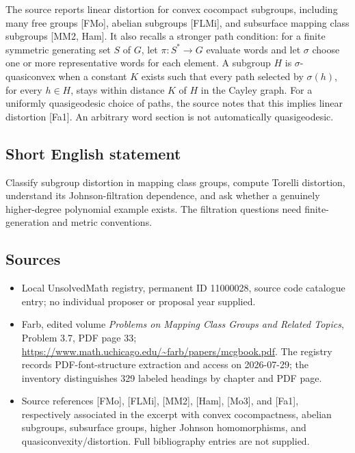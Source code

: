 \documentclass[11pt]{article}
\begin{document}
The source reports linear distortion for convex cocompact subgroups, including many free groups [FMo], abelian subgroups [FLMi], and subsurface mapping class subgroups [MM2, Ham]. It also recalls a stronger path condition: for a finite symmetric generating set $S$ of $G$, let $\pi:S^*\to G$ evaluate words and let $\sigma$ choose one or more representative words for each element. A subgroup $H$ is $\sigma$-quasiconvex when a constant $K$ exists such that every path selected by $\sigma(h)$, for every $h\in H$, stays within distance $K$ of $H$ in the Cayley graph. For a uniformly quasigeodesic choice of paths, the source notes that this implies linear distortion [Fa1]. An arbitrary word section is not automatically quasigeodesic.
\subsection{Short English statement}
Classify subgroup distortion in mapping class groups, compute Torelli distortion, understand its Johnson-filtration dependence, and ask whether a genuinely higher-degree polynomial example exists. The filtration questions need finite-generation and metric conventions.
\subsection{Sources}
\begin{itemize}
\item Local UnsolvedMath registry, permanent ID 11000028, source code catalogue entry; no individual proposer or proposal year supplied.
\item Farb, edited volume \emph{Problems on Mapping Class Groups and Related Topics}, Problem 3.7, PDF page 33; \url{https://www.math.uchicago.edu/~farb/papers/mcgbook.pdf}. The registry records PDF-font-structure extraction and access on 2026-07-29; the inventory distinguishes 329 labeled headings by chapter and PDF page.
\item Source references [FMo], [FLMi], [MM2], [Ham], [Mo3], and [Fa1], respectively associated in the excerpt with convex cocompactness, abelian subgroups, subsurface groups, higher Johnson homomorphisms, and quasiconvexity/distortion. Full bibliography entries are not supplied.
\end{itemize}
\end{document}
